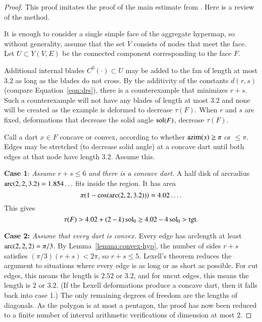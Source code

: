 \begin{proof} This proof imitates the proof of the main estimate from \cite{Hales:2006:DCG}.    Here is a review of the method.

It is enough to consider a single simple face of the aggregate hypermap, so without generality,   assume that the set $V$ consists of nodes that meet the face.  Let $U\subset Y(V,E)$ be the connected component corresponding to the face $F$.

Additional internal blades $C^0(\cdot)\subset U$ may be added to the fan of length at most $3.2$ as long as the blades do not cross.  By the additivity of the constants $d(r,s)$ (compare Equation~\ref{eqn:drs}), there is a counterexample that minimizes $r+s$.  Such a counterexample will not have any blades of length at most $3.2$ and none will be created as the example is deformed to decrease $\tau(F)$.  When $r$ and $s$ are fixed, deformations that decrease the solid angle $\operatorname{sol}(F)$, decrease $\tau(F)$.
%

Call a dart $x\in F$ concave or convex, according to whether ${\operatorname{azim}}(x)\ge\pi$ or $\le\pi$.  Edges may be stretched (to decrease solid angle) at a concave dart until both edges at that node have length $3.2$. Assume this.
%
%
%

{\bf Case 1}:
{\it Assume $r+s\le6$ and there is a concave dart.}  A half disk of arcradius $\operatorname{arc}(2,2,3.2)=1.854\ldots$ fits inside the region.  It has area
$$\pi(1-\cos(\operatorname{arc}(2,2,3.2)))=4.02\ldots.$$
This gives
$$\tau(F) > 4.02 + (2-k)\operatorname{sol}_0 \ge 4.02 -4 \operatorname{sol}_0 > {\operatorname{tgt}}.$$
%
%

{\bf Case 2:}
{\it Assume that every dart is convex.}
Every edge has arclength at least $\operatorname{arc}(2,2,2)=\pi/3$.  By Lemma~\ref{lemma:convex-hyp}, the number of sides $r+s$ satisfies $(\pi/3)(r+s) < 2\pi$, so $r+s\le5$.  Lexell's theorem reduces the argument to situations where every edge is as long or as short as possible.  For cut edges, this means the length is $2.52$ or $3.2$, and for uncut edges, this means the length is $2$ or $3.2$.  (If the Lexell deformations produce a concave dart, then it falls back into case 1.)  The only remaining degrees of freedom are the lengths of diagonals.  As the polygon is at most a pentagon, the proof has now been reduced to a finite number of interval arithmetic verifications of dimension at most $2$.
%


\end{proof}
